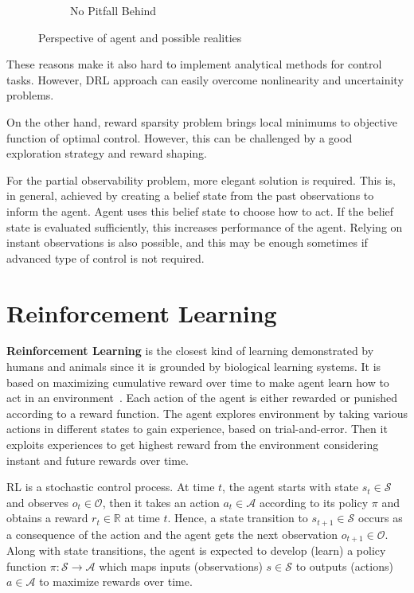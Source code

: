\documentclass[a4paper, 12pt]{article} %
\begin{document}
\begin{figure}
\begin{subfigure}{.32\textwidth}
		\caption{No Pitfall Behind}
		\label{fig:no_pitfall_behind}
	\end{subfigure}
	\caption{Perspective of agent and possible realities}
	\label{fig:partial_obs}
\end{figure}

These reasons make it also hard to implement analytical methods for control tasks. 
However, DRL approach can easily overcome nonlinearity and uncertainity problems.

On the other hand, reward sparsity problem brings local minimums to objective function of optimal control. However, this can be challenged by a good exploration strategy and reward shaping. 

For the partial observability problem, more elegant solution is required. 
This is, in general, achieved by creating a belief state from the past observations to inform the agent. 
Agent uses this belief state to choose how to act. 
If the belief state is evaluated sufficiently, 
this increases performance of the agent.
Relying on instant observations is also possible, 
and this may be enough sometimes if advanced type of control is not required. 

\section{Reinforcement Learning}

\textbf{Reinforcement Learning} is the closest kind of learning demonstrated by humans and animals 
since it is grounded by biological learning systems. 
It is based on maximizing cumulative reward over time to make agent 
learn how to act in an environment~\cite{sutton_reinforcement_1998}. 
Each action of the agent is either rewarded or punished according to a reward function. 
The agent explores environment by taking various actions in different states to gain experience, based on trial-and-error. 
Then it exploits experiences to get highest reward from the environment considering instant and future rewards over time. 

RL is a stochastic control process. 
At time $t$, the agent starts with state $s_t \in \mathcal{S}$ and observes $o_t \in \mathcal{O}$, 
then it takes an action $a_t \in \mathcal{A}$ according to its policy $\pi$ and obtains a reward $r_t \in \mathbb{R}$ at time $t$. 
Hence, a state transition to $s_{t+1} \in \mathcal{S}$ occurs as a consequence of the action and the agent gets the next observation $o_{t+1} \in \mathcal{O}$. 
Along with state transitions, the agent is expected to develop (learn) a policy function 
$\pi \colon \mathcal{S} \rightarrow \mathcal{A}$ which maps 
inputs (observations) $s \in \mathcal{S}$ to outputs (actions) $a \in \mathcal{A}$ to maximize rewards over time.
\end{document}

